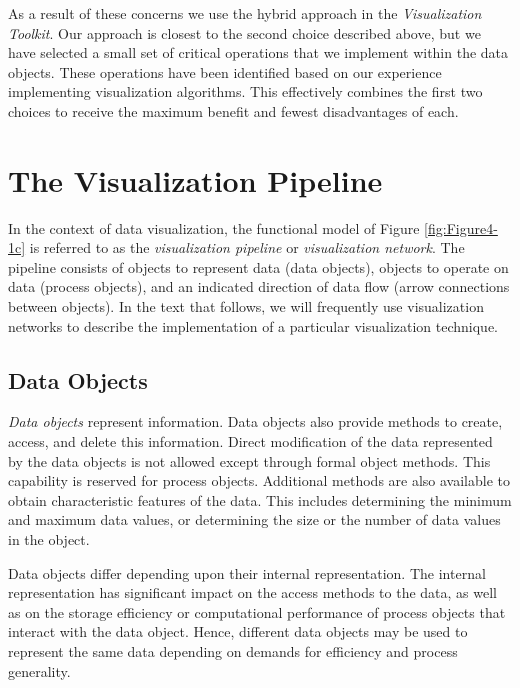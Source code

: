 As a result of these concerns we use the hybrid approach in the \emph{Visualization Toolkit}. Our approach is closest to the second choice described above, but we have selected a small set of critical operations that we implement within the data objects. These operations have been identified based on our experience implementing visualization algorithms. This effectively combines the first two choices to receive the maximum benefit and fewest disadvantages of each.

\section{The Visualization Pipeline}
\label{sec:visualization_pipeline}

In the context of data visualization, the functional model of Figure \ref{fig:Figure4-1c} is referred to as the \emph{visualization pipeline} or \emph{visualization network}. The pipeline consists of objects to represent data (data objects), objects to operate on data (process objects), and an indicated direction of data flow (arrow connections between objects). In the text that follows, we will frequently use visualization networks to describe the implementation of a particular visualization technique.

\subsection{Data Objects}
\label{subsec:data_objects}

\emph{Data objects} represent information. Data objects also provide methods to create, access, and delete this information. Direct modification of the data represented by the data objects is not allowed except through formal object methods. This capability is reserved for process objects. Additional methods are also available to obtain characteristic features of the data. This includes determining the minimum and maximum data values, or determining the size or the number of data values in the object.

Data objects differ depending upon their internal representation. The internal representation has significant impact on the access methods to the data, as well as on the storage efficiency or computational performance of process objects that interact with the data object. Hence, different data objects may be used to represent the same data depending on demands for efficiency and process generality.

